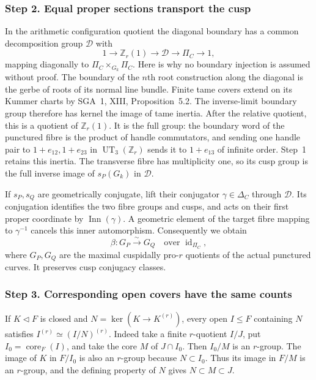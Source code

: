 \documentclass[11pt,a4paper]{article}
\begin{document}
\subsubsection*{Step 2. Equal proper sections transport the cusp}
In the arithmetic configuration quotient the diagonal boundary has
a common decomposition group $\mathcal D$ with
\[
 1\to\mathbb Z_r(1)\to\mathcal D\to\Pi_C\to1,
 \tag{A05.2}
\]
mapping diagonally to $\Pi_C\times_{G_k}\Pi_C$. Here is why no
boundary injection is assumed without proof. The boundary of the
$n$th root construction along the diagonal is the gerbe of roots
of its normal line bundle. Finite tame covers extend on its
Kummer charts by SGA~1, XIII, Proposition~5.2. The inverse-limit
boundary group therefore has kernel the image of tame inertia.
After the relative quotient, this is a quotient of $\mathbb Z_r(1)$.
It is the full group: the boundary word of the punctured fibre is
the product of handle commutators, and sending one handle pair
to $1+e_{12},1+e_{23}$ in $\operatorname{UT}_3(\mathbb Z_r)$
sends it to $1+e_{13}$ of infinite order. Step~1 retains this
inertia. The transverse fibre has multiplicity one, so its cusp
group is the full inverse image of $s_P(G_k)$ in $\mathcal D$.

If $s_P,s_Q$ are geometrically conjugate, lift their conjugator
$\gamma\in\Delta_C$ through $\mathcal D$. Its conjugation
identifies the two fibre groups and cusps, and acts on their first
proper coordinate by $\operatorname{Inn}(\gamma)$. A geometric
element of the target fibre mapping to $\gamma^{-1}$ cancels this
inner automorphism. Consequently we obtain
\[
 \beta:G_P\xrightarrow\sim G_Q
 \quad\text{over }\operatorname{id}_{\Pi_C},
 \tag{A05.3}
\]
where $G_P,G_Q$ are the maximal cuspidally pro-$r$ quotients of
the actual punctured curves. It preserves cusp conjugacy classes.

\subsubsection*{Step 3. Corresponding open covers have the same counts}
If $K\triangleleft F$ is closed and
$N=\ker(K\to K^{(r)})$, every open $I\le F$ containing $N$
satisfies $I^{(r)}\simeq(I/N)^{(r)}$. Indeed take a finite
$r$-quotient $I/J$, put $I_0=\operatorname{core}_F(I)$, and take
the core $M$ of $J\cap I_0$. Then $I_0/M$ is an $r$-group.
The image of $K$ in $F/I_0$ is also an $r$-group because
$N\subset I_0$. Thus its image in $F/M$ is an $r$-group, and
the defining property of $N$ gives $N\subset M\subset J$.
\end{document}
